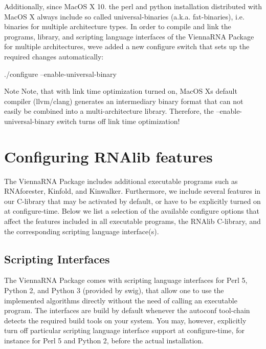 Additionally, since Mac\+OS X 10. the perl and python installation distributed with Mac\+OS X always include so called universal-\/binaries (a.\+k.\+a. fat-\/binaries), i.\+e. binaries for multiple architecture types. In order to compile and link the programs, library, and scripting language interfaces of the Vienna\+R\+NA Package for multiple architectures, we\textquotesingle{}ve added a new configure switch that sets up the required changes automatically\+:

\begin{DoxyVerb}./configure --enable-universal-binary
\end{DoxyVerb}


\begin{DoxyNote}{Note}
Note, that with link time optimization turned on, Mac\+OS X\textquotesingle{}s default compiler (llvm/clang) generates an intermediary binary format that can not easily be combined into a multi-\/architecture library. Therefore, the --enable-\/universal-\/binary switch turns off link time optimization!
\end{DoxyNote}
\hypertarget{install_configuration}{}\section{Configuring R\+N\+Alib features}\label{install_configuration}
The Vienna\+R\+NA Package includes additional executable programs such as R\+N\+Aforester, Kinfold, and Kinwalker. Furthermore, we include several features in our C-\/library that may be activated by default, or have to be explicitly turned on at configure-\/time. Below we list a selection of the available configure options that affect the features included in all executable programs, the R\+N\+Alib C-\/library, and the corresponding scripting language interface(s).\hypertarget{install_config_swig}{}\subsection{Scripting Interfaces}\label{install_config_swig}
The Vienna\+R\+NA Package comes with scripting language interfaces for Perl 5, Python 2, and Python 3 (provided by swig), that allow one to use the implemented algorithms directly without the need of calling an executable program. The interfaces are build by default whenever the autoconf tool-\/chain detects the required build tools on your system. You may, however, explicitly turn off particular scripting language interface support at configure-\/time, for instance for Perl 5 and Python 2, before the actual installation.

